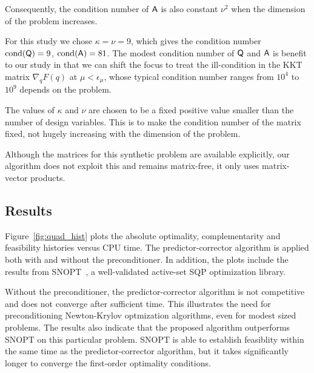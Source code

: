 Consequently, the condition number of $\mathsf{A}$ is also constant $\nu ^2$ when the dimension 
of the problem increases. 


For this study we chose $\kappa = \nu = 9$, which gives the condition number 
$ \text{cond} (\mathsf{Q} )= 9$,  $ \text{cond} (\mathsf{A}) = 81$. The modest condition number of 
$\mathsf{Q} $ and $\mathsf{A}$ is benefit to our study in that we can shift 
the focus to treat the ill-condition in the KKT matrix 
$\nabla_{q} F(q)$ at $\mu<\epsilon_{\mu}$, whose typical condition number ranges from $10^4$ to $10^9$
depends on the problem.

The values of $\kappa$ and $\nu$ are chosen to be a fixed positive
value smaller than the number of design variables.  This is to make the
condition number of the matrix fixed, not hugely increasing with the
dimension of the problem.

\begin{remark}
Although the matrices for this synthetic problem are available explicitly, our
algorithm does not exploit this and remains matrix-free, \ie it only uses
matrix-vector products.
\end{remark}

\subsection{Results}
Figure~\ref{fig:quad_hist} plots the absolute optimality, complementarity and feasibility
histories versus CPU time. 
The predictor-corrector algorithm is applied both with and without the preconditioner.  
In addition, the plots include the results
from SNOPT~\cite{gill:2002}, a well-validated active-set SQP
optimization library.

Without the preconditioner, the predictor-corrector algorithm is not competitive
and does not converge after sufficient time.  This illustrates the need for preconditioning Newton-Krylov
optmization algorithms, even for modest sized problems.  The results
also indicate that the proposed algorithm outperforms SNOPT on this particular
problem.  SNOPT is able to establish feasiblity within the same time as the
predictor-corrector algorithm, but it takes significantly longer to converge the
first-order optimality conditions.

